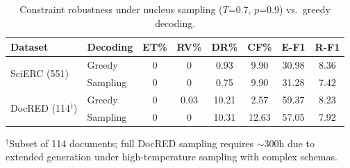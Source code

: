 \begin{table}[h]
\centering
\caption{Constraint robustness under nucleus sampling ($T$=0.7, $p$=0.9) vs.\ greedy decoding.}
\label{tab:sampling-robustness}
\begin{tabular}{llcccccc}
\toprule
Dataset & Decoding & ET\% & RV\% & DR\% & CF\% & E-F1 & R-F1 \\
\midrule
\multirow{2}{*}{SciERC (551)} & Greedy & 0 & 0 & 0.93 & 9.90 & 30.98 & 8.36 \\
& Sampling & 0 & 0 & 0.75 & 9.90 & 31.28 & 7.42 \\
\midrule
\multirow{2}{*}{DocRED (114$^\dagger$)} & Greedy & 0 & 0.03 & 10.21 & 2.57 & 59.37 & 8.23 \\
& Sampling & 0 & 0 & 10.31 & 12.63 & 57.05 & 7.92 \\
\bottomrule
\end{tabular}
\par\smallskip\footnotesize $^\dagger$Subset of 114 documents; full DocRED sampling requires ${\sim}300$h due to extended generation under high-temperature sampling with complex schemas.
\end{table}
